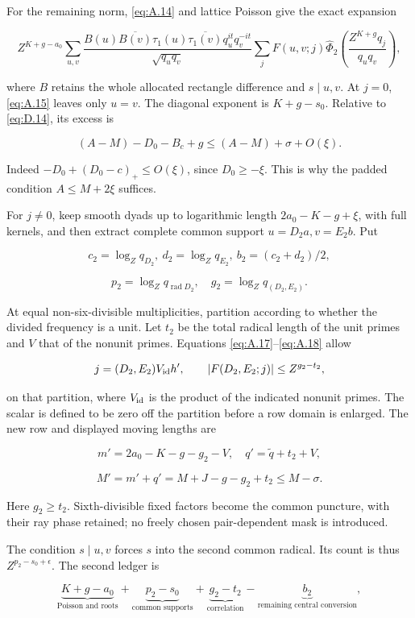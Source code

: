 \documentclass[11pt,a4paper]{article}
\begin{document}
For the remaining norm, \eqref{eq:A.14} and lattice Poisson give the exact expansion

\[
Z^{K+g-a_0}\sum_{u,v}
\frac{B(u)\overline{B(v)}\tau_1(u)\overline{\tau_1(v)}q_u^{it}q_v^{-it}}{\sqrt{q_uq_v}}
\sum_jF(u,v;j)\widehat\Phi_2\!\left(\frac{Z^{K+g}q_j}{q_uq_v}\right),
\tag{D.17}\label{eq:D.17}
\]

where \(B\) retains the whole allocated rectangle difference and \(s\mid u,v\). At \(j=0\), \eqref{eq:A.15} leaves only \(u=v\). The diagonal exponent is \(K+g-s_0\). Relative to \eqref{eq:D.14}, its excess is

\[
(A-M)-D_0-B_c+g\le (A-M)+\sigma+O(\xi).
\tag{D.18}\label{eq:D.18}
\]

Indeed \(-D_0+(D_0-c)_+\le O(\xi)\), since \(D_0\ge-\xi\). This is why the padded condition \(A\le M+2\xi\) suffices.

For \(j\ne0\), keep smooth dyads up to logarithmic length \(2a_0-K-g+\xi\), with full kernels, and then extract complete common support \(u=D_2a,v=E_2b\). Put

\[
c_2=\log_Zq_{D_2},\ d_2=\log_Zq_{E_2},\ b_2=(c_2+d_2)/2,
\]

\[
p_2=\log_Zq_{\operatorname{rad}D_2},\quad g_2=\log_Zq_{(D_2,E_2)}.
\]

At equal non-six-divisible multiplicities, partition according to whether the divided frequency is a unit. Let \(t_2\) be the total radical length of the unit primes and \(V\) that of the nonunit primes. Equations \eqref{eq:A.17}--\eqref{eq:A.18} allow

\[
j=(D_2,E_2)V_{\rm id}h',\qquad
|F(D_2,E_2;j)|\le Z^{g_2-t_2},
\]

on that partition, where \(V_{\rm id}\) is the product of the indicated nonunit primes. The scalar is defined to be zero off the partition before a row domain is enlarged. The new row and displayed moving lengths are

\[
m'=2a_0-K-g-g_2-V,\quad q'=\widetilde q+t_2+V,
\]

\[
M'=m'+q'=M+J-g-g_2+t_2\le M-\sigma.
\tag{D.19}\label{eq:D.19}
\]

Here \(g_2\ge t_2\). Sixth-divisible fixed factors become the common puncture, with their ray phase retained; no freely chosen pair-dependent mask is introduced.

The condition \(s\mid u,v\) forces \(s\) into the second common radical. Its count is thus \(Z^{p_2-s_0+\epsilon}\). The second ledger is

\[
\underbrace{K+g-a_0}_{\text{Poisson and roots}}
+\underbrace{p_2-s_0}_{\text{common supports}}
+\underbrace{g_2-t_2}_{\text{correlation}}
-\underbrace{b_2}_{\text{remaining central conversion}},
\tag{D.20}\label{eq:D.20}
\]
\end{document}
